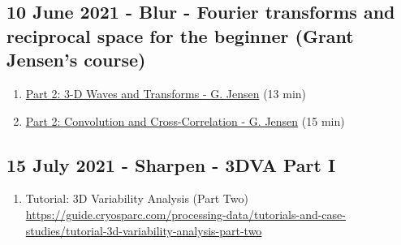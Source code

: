 \documentclass[11pt, oneside]{article}   	%
\begin{document}
\subsection{10 June 2021 - Blur - Fourier transforms and reciprocal space for the beginner (Grant Jensen's course)}
\begin{enumerate}
	\item \href{https://youtu.be/INtehLmqfmA}{Part 2: 3-D Waves and Transforms - G. Jensen} (13 min)
	\item \href{https://youtu.be/MQm6ZP1F6ms}{Part 2: Convolution and Cross-Correlation - G. Jensen} (15 min)
	\end{enumerate}

\subsection{15 July 2021 - Sharpen - 3DVA Part I}
\begin{enumerate}
	\item Tutorial: 3D Variability Analysis (Part Two) \url{https://guide.cryosparc.com/processing-data/tutorials-and-case-studies/tutorial-3d-variability-analysis-part-two}
\end{enumerate}
\end{document}
